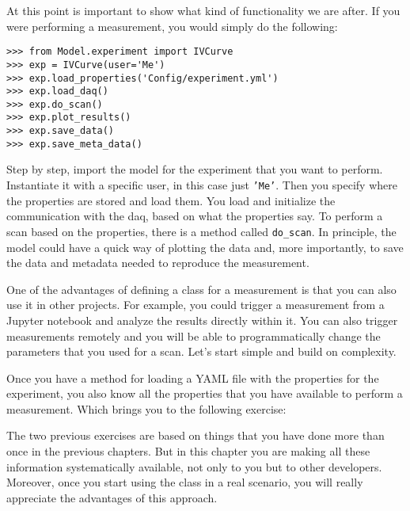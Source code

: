 At this point is important to show what kind of functionality we are
after. If you were performing a measurement, you would simply do
the following:

\begin{verbatim}
>>> from Model.experiment import IVCurve
>>> exp = IVCurve(user='Me')
>>> exp.load_properties('Config/experiment.yml')
>>> exp.load_daq()
>>> exp.do_scan()
>>> exp.plot_results()
>>> exp.save_data()
>>> exp.save_meta_data()
\end{verbatim}

Step by step, import the model for the experiment that you want to
perform. Instantiate it with a specific user, in this case just
\texttt{'Me'}. Then you specify where
the properties are stored and load them. You load and initialize the
communication with the daq, based on what the properties say. To perform
a scan based on the properties, there is a method called
\texttt{do_scan}. In principle, the model could have a quick way of
plotting the data and, more importantly, to save the data and metadata
needed to reproduce the measurement.

One of the advantages of defining a class for a measurement is that you
can also use it in other projects. For example, you could trigger a
measurement from a Jupyter notebook and analyze the results directly
within it. You can also trigger measurements remotely and you will be
able to programmatically change the parameters that you used for a scan.
Let's start simple and build on complexity.


Once you have a method for loading a {YAML} file with the properties for
the experiment, you also know all the properties that you have available
to perform a measurement. Which brings you to the following exercise:


The two previous exercises are based on things that you have done more
than once in the previous chapters. But in this chapter you are making
all these information systematically available, not only to you but to
other developers. Moreover, once you start using the class in a real
scenario, you will really appreciate the advantages of this approach.

